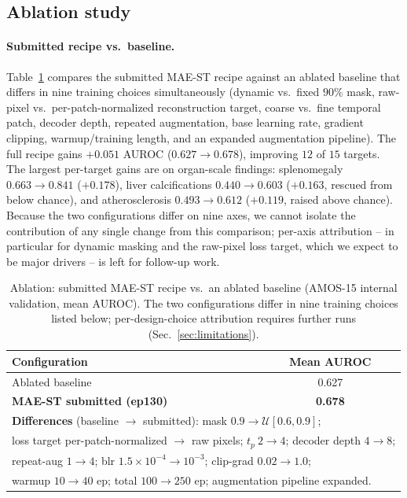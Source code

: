 \documentclass[runningheads]{llncs}
\begin{document}
\subsection{Ablation study}
\label{sec:ablation}

\paragraph{Submitted recipe vs.\ baseline.}
Table~\ref{tab:ablation} compares the submitted MAE-ST recipe against an
ablated baseline that differs in nine training choices simultaneously
(dynamic vs.\ fixed $90\%$ mask, raw-pixel vs.\ per-patch-normalized
reconstruction target, coarse vs.\ fine temporal patch, decoder depth,
repeated augmentation, base learning rate, gradient clipping,
warmup/training length, and an expanded augmentation pipeline). The full
recipe gains $+0.051$ AUROC ($0.627 \to 0.678$),
improving $12$ of $15$ targets. The largest per-target gains are on
organ-scale findings: splenomegaly $0.663\!\to\!0.841$ ($+0.178$),
liver calcifications $0.440\!\to\!0.603$ ($+0.163$, rescued from
below chance), and atherosclerosis $0.493\!\to\!0.612$ ($+0.119$, raised
above chance). Because the two configurations differ on nine
axes, we cannot isolate the contribution of any single change from this
comparison; per-axis attribution -- in particular for dynamic masking and
the raw-pixel loss target, which we expect to be major drivers -- is left
for follow-up work.

\begin{table}[htbp]
\caption{Ablation: submitted MAE-ST recipe vs.\ an ablated baseline (AMOS-15
internal validation, mean AUROC). The two configurations differ in nine
training choices listed below; per-design-choice attribution requires further
runs (Sec.~\ref{sec:limitations}).}\label{tab:ablation}
\centering
\begin{tabular}{lc}
\hline
Configuration & Mean AUROC \\ \hline
Ablated baseline & 0.627 \\
\textbf{MAE-ST submitted (ep130)} & \textbf{0.678} \\ \hline
\multicolumn{2}{l}{\footnotesize \textbf{Differences} (baseline $\rightarrow$
submitted):
mask $0.9 \to \mathcal{U}[0.6,0.9]$;} \\
\multicolumn{2}{l}{\footnotesize loss target per-patch-normalized $\to$ raw
pixels; $t_p\ 2 \to 4$; decoder depth $4 \to 8$;} \\
\multicolumn{2}{l}{\footnotesize repeat-aug $1 \to 4$;
blr $1.5{\times}10^{-4} \to 10^{-3}$; clip-grad $0.02 \to 1.0$;} \\
\multicolumn{2}{l}{\footnotesize warmup $10 \to 40$ ep; total $100 \to 250$ ep;
augmentation pipeline expanded.} \\ \hline
\end{tabular}
\end{table}
\end{document}
